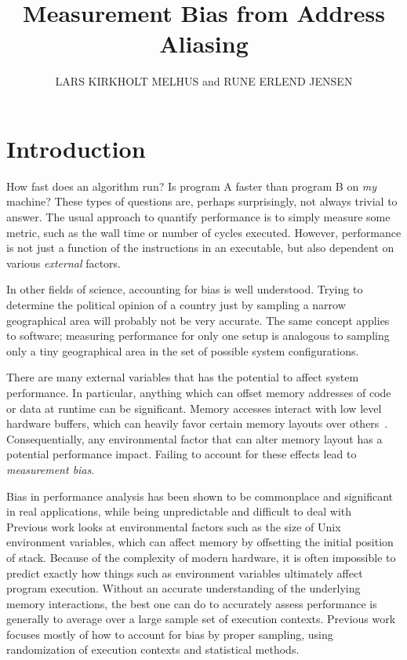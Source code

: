 \documentclass[prodmode,acmtaco]{acmsmall}
\title{Measurement Bias from Address Aliasing}
\author{
LARS KIRKHOLT MELHUS and RUNE ERLEND JENSEN
  \affil{Norwegian University of Science and Technology}}
\begin{document}
\begin{bottomstuff}
\end{bottomstuff}

\maketitle


\section{Introduction}
How fast does an algorithm run?
Is program A faster than program B on \emph{my} machine?
These types of questions are, perhaps surprisingly, not always trivial to answer.
The usual approach to quantify performance is to simply measure some metric, such as the wall time or number of cycles executed.
However, performance is not just a function of the instructions in an executable, but also dependent on various \emph{external} factors.

In other fields of science, accounting for bias is well understood.
Trying to determine the political opinion of a country just by sampling a narrow geographical area will probably not be very accurate.
The same concept applies to software; measuring performance for only one setup is analogous to sampling only a tiny geographical area in the set of possible system configurations.

There are many external variables that has the potential to affect system performance.
In particular, anything which can offset memory addresses of code or data at runtime can be significant.
Memory accesses interact with low level hardware buffers, which can heavily favor certain memory layouts over others~\cite{Hundt:2011:MAO}.
Consequentially, any environmental factor that can alter memory layout has a potential performance impact.
Failing to account for these effects lead to \emph{measurement bias}. 

Bias in performance analysis has been shown to be commonplace and significant in real applications, while being unpredictable and difficult to deal with~%
Previous work looks at environmental factors such as the size of Unix environment variables, which can affect memory by offsetting the initial position of stack.
Because of the complexity of modern hardware, it is often impossible to predict exactly how things such as environment variables ultimately affect program execution.
Without an accurate understanding of the underlying memory interactions, the best one can do to accurately assess performance is generally to average over a large sample set of execution contexts.
Previous work focuses mostly of how to account for bias by proper sampling, using randomization of execution contexts and statistical methods. %
\end{document}
